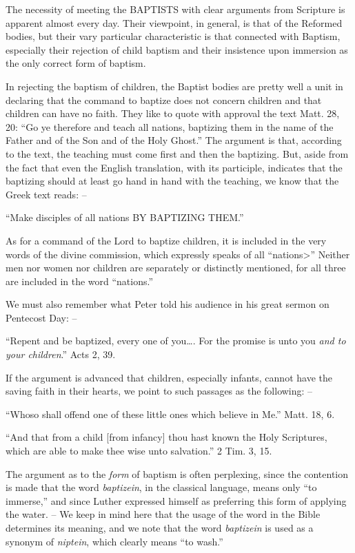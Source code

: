 \documentclass[
]{book}
\begin{document}
The necessity of meeting the BAPTISTS with clear arguments from Scripture is apparent almost every day. Their viewpoint, in general, is that of the Reformed bodies, but their vary particular characteristic is that connected with Baptism, especially their rejection of child baptism and their insistence upon immersion as the only correct form of baptism.

In rejecting the baptism of children, the Baptist bodies are pretty well a unit in declaring that the command to baptize does not concern children and that children can have no faith. They like to quote with approval the text Matt. 28, 20: ``Go ye therefore and teach all nations, baptizing them in the name of the Father and of the Son and of the Holy Ghost.'' The argument is that, according to the text, the teaching must come first and then the baptizing. But, aside from the fact that even the English translation, with its participle, indicates that the baptizing should at least go hand in hand with the teaching, we know that the Greek text reads: --

``Make disciples of all nations BY BAPTIZING THEM.''

As for a command of the Lord to baptize children, it is included in the very words of the divine commission, which expressly speaks of all ``nations\textgreater{}'' Neither men nor women nor children are separately or distinctly mentioned, for all three are included in the word ``nations.''

We must also remember what Peter told his audience in his great sermon on Pentecost Day: --

``Repent and be baptized, every one of you\ldots. For the promise is unto you \emph{and to your children}.'' Acts 2, 39.

If the argument is advanced that children, especially infants, cannot have the saving faith in their hearts, we point to such passages as the following: --

``Whoso shall offend one of these little ones which believe in Me.'' Matt. 18, 6.

``And that from a child {[}from infancy{]} thou hast known the Holy Scriptures, which are able to make thee wise unto salvation.'' 2 Tim. 3, 15.

The argument as to the \emph{form} of baptism is often perplexing, since the contention is made that the word \emph{baptizein}, in the classical language, means only ``to immerse,'' and since Luther expressed himself as preferring this form of applying the water. -- We keep in mind here that the usage of the word in the Bible determines its meaning, and we note that the word \emph{baptizein} is used as a synonym of \emph{niptein}, which clearly means ``to wash.''
\end{document}
